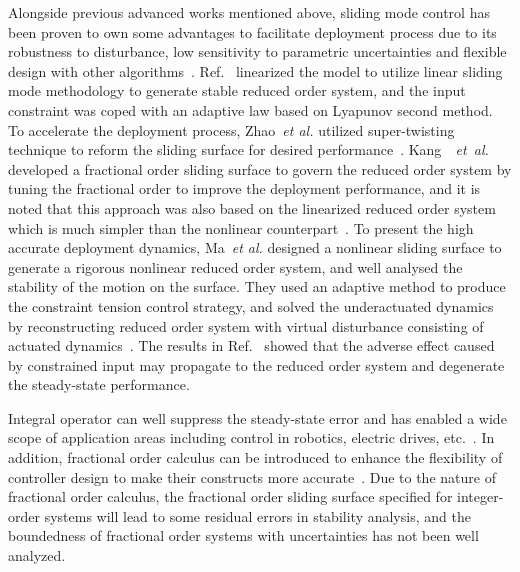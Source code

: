 \documentclass[ShortAfour]{sage}
\theoremstyle{plain}
\theoremstyle{remark}
\begin{document}
Alongside previous advanced works mentioned above, sliding mode control has been proven to own some advantages to facilitate deployment process due to its robustness to disturbance, low sensitivity to parametric uncertainties and flexible design with other algorithms~\cite{MA2017355}. 
Ref.~\cite{MA201667} linearized the model to utilize linear sliding mode methodology to generate stable reduced order system, and the input constraint was coped with an adaptive law based on Lyapunov second method. 
To accelerate the deployment process, Zhao~{\it et al.} utilized super-twisting technique to reform the sliding surface for desired performance~\cite{zhao2018dynamic}. 
Kang~{\it~et~al.} developed a fractional order sliding surface to govern the reduced order system by tuning the fractional order to improve the deployment performance, and it is noted that this approach was also based on the linearized reduced order system which is much simpler than the nonlinear counterpart~\cite{KANG2017263}. 
To present the high accurate deployment dynamics, Ma~{\it et al.} designed a nonlinear sliding surface to generate a rigorous nonlinear reduced order system, and well analysed the stability of the motion on the surface. They used an adaptive method to produce the constraint tension control strategy, and solved the underactuated dynamics by reconstructing reduced order system with virtual disturbance consisting of actuated dynamics~\cite{Ma2017Pure}. The results in Ref.~\cite{Ma2017Pure} showed that the adverse effect caused by constrained input may propagate to the reduced order system and degenerate the steady-state performance.
 
Integral operator can well suppress the steady-state error and has enabled a wide scope of application areas including control in robotics,  electric drives, etc.~\cite{Utkin1996}. 
In addition, fractional order calculus can be introduced to enhance the flexibility of controller design to make their constructs more accurate~\cite{sun2018practical,sun2018discrete,sun2017practical}. Due to the nature of fractional order calculus, the fractional order sliding surface specified for integer-order systems will lead to some residual errors in stability analysis, and the boundedness of  fractional order systems with uncertainties has not been well analyzed. 
\end{document}
